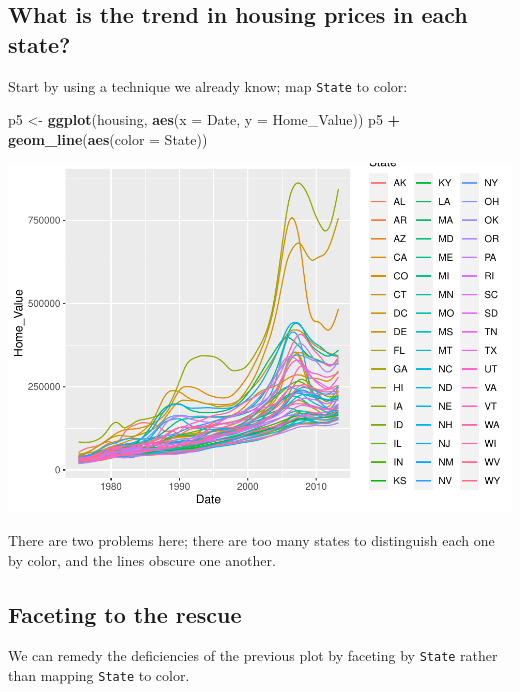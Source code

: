 \documentclass[
]{book}
\newenvironment{Shaded}{\begin{snugshade}}{\end{snugshade}}
\newcommand{\DataTypeTok}[1]{\textcolor[rgb]{0.13,0.29,0.53}{#1}}
\newcommand{\KeywordTok}[1]{\textcolor[rgb]{0.13,0.29,0.53}{\textbf{#1}}}
\newcommand{\NormalTok}[1]{#1}
\newcommand{\OperatorTok}[1]{\textcolor[rgb]{0.81,0.36,0.00}{\textbf{#1}}}
\newcommand{\StringTok}[1]{\textcolor[rgb]{0.31,0.60,0.02}{#1}}
\begin{document}
\hypertarget{what-is-the-trend-in-housing-prices-in-each-state}{%
\subsection{What is the trend in housing prices in each state?}\label{what-is-the-trend-in-housing-prices-in-each-state}}

Start by using a technique we already know; map \texttt{State} to color:

\begin{Shaded}
\begin{Highlighting}[]
\NormalTok{p5 \textless{}{-}}\StringTok{ }\KeywordTok{ggplot}\NormalTok{(housing, }\KeywordTok{aes}\NormalTok{(}\DataTypeTok{x =}\NormalTok{ Date, }\DataTypeTok{y =}\NormalTok{ Home\_Value))}
\NormalTok{p5 }\OperatorTok{+}\StringTok{ }\KeywordTok{geom\_line}\NormalTok{(}\KeywordTok{aes}\NormalTok{(}\DataTypeTok{color =}\NormalTok{ State))  }
\end{Highlighting}
\end{Shaded}

\includegraphics{R/Rgraphics/figures/unnamed-chunk-192-1.pdf}

There are two problems here; there are too many states to distinguish each one by color, and the lines obscure one another.

\hypertarget{faceting-to-the-rescue}{%
\subsection{Faceting to the rescue}\label{faceting-to-the-rescue}}

We can remedy the deficiencies of the previous plot by faceting by \texttt{State} rather than mapping \texttt{State} to color.
\end{document}

